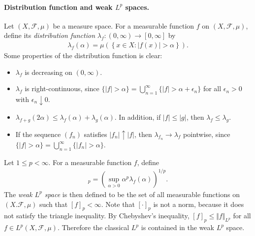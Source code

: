 \documentclass{article}
\numberwithin{equation}{section}
\newcommand{\scr}{\mathscr}
\theoremstyle{plain}
\theoremstyle{definition}
\begin{document}
\paragraph{Distribution function and weak $L^p$ spaces.} Let $(X,\scr{F},\mu)$ be a measure space. For a measurable function $f$ on $(X,\scr{F},\mu)$, define its \textit{distribution function} $\lambda_f:(0,\infty)\to[0,\infty]$ by
\begin{align*}
	\lambda_f(\alpha)=\mu\left(\left\{x\in X:\vert f(x)\vert>\alpha\right\}\right).
\end{align*}
Some properties of the distribution function is clear:
\begin{itemize}
	\item $\lambda_f$ is decreasing on $(0,\infty)$.
	\item $\lambda_f$ is right-continuous, since $\{\vert f\vert>\alpha\}=\bigcup_{n=1}^\infty\{\vert f\vert>\alpha+\epsilon_n\}$ for all $\epsilon_n>0$ with $\epsilon_n\downarrow 0$.
	\item $\lambda_{f+g}(2\alpha)\leq\lambda_f(\alpha)+\lambda_g(\alpha)$. In addition, if $\vert f\vert\leq\vert g\vert$, then $\lambda_f\leq\lambda_g$. 
	\item If the sequence $(f_n)$ satisfies $\vert f_n\vert\uparrow\vert f\vert$, then $\lambda_{f_n}\to\lambda_f$ pointwise, since $\{\vert f\vert>\alpha\}=\bigcup_{n=1}^\infty\{\vert f_n\vert>\alpha\}$.
\end{itemize}
Let $1\leq p<\infty$. For a measurable function $f$, define\vspace{-0.15cm}
\begin{align*}
	[f]_p=\left(\sup_{\alpha>0}\alpha^p\lambda_{f}(\alpha)\right)^{1/p}.
\end{align*}
The \textit{weak $L^p$ space} is then defined to be the set of all measurable functions on $(X.\scr{F},\mu)$ such that $[f]_p<\infty$. Note that $[\cdot]_p$ is not a norm, because it does not satisfy the triangle inequality. By Chebyshev's inequality, $[f]_p\leq\Vert f\Vert_{L^p}$ for all $f\in L^p(X,\scr{F},\mu)$. Therefore the classical $L^p$ is contained in the weak $L^p$ space. 
\end{document}
